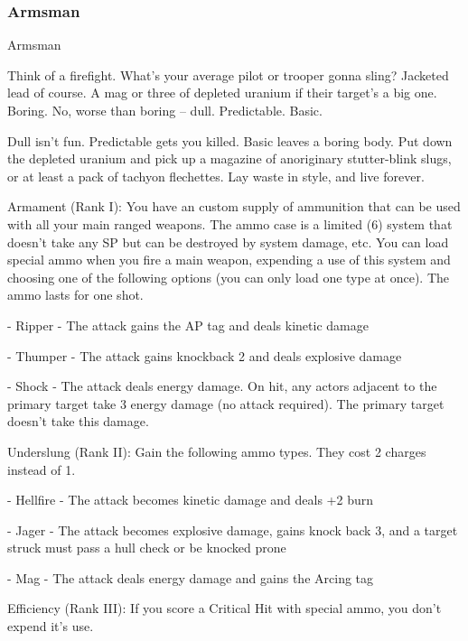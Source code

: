 \subsubsection{Armsman}


                                                  Armsman

 Think of a firefight. What’s your average pilot or trooper gonna sling? Jacketed lead of course. A mag or
three of depleted uranium if their target’s a big one. Boring. No, worse than boring -- dull. Predictable.
Basic.

Dull isn’t fun. Predictable gets you killed. Basic leaves a boring body. Put down the depleted uranium and
pick up a magazine of anoriginary stutter-blink slugs, or at least a pack of tachyon flechettes. Lay waste in
style, and live forever.

Armament (Rank I): You have an custom supply of ammunition that can be used with all your
main ranged weapons. The ammo case is a limited (6) system that doesn’t take any SP but can
be destroyed by system damage, etc. You can load special ammo when you fire a main weapon,
expending a use of this system and choosing one of the following options (you can only load one
type at once). The ammo lasts for one shot.

         	- Ripper - The attack gains the AP tag and deals kinetic damage

         	- Thumper - The attack gains knockback 2 and deals explosive damage

         	- Shock - The attack deals energy damage. On hit, any actors adjacent to the primary target
         take 3 energy damage (no attack required). The primary target doesn’t take this damage.

Underslung (Rank II): Gain the following ammo types. They cost 2 charges instead of 1.

         	- Hellfire - The attack becomes kinetic damage and deals +2 burn

         - Jager - The attack becomes explosive damage, gains knock back 3, and a target struck
         must pass a hull check or be knocked prone

         	- Mag - The attack deals energy damage and gains the Arcing tag

Efficiency (Rank III): If you score a Critical Hit with special ammo, you don’t expend it’s use.
